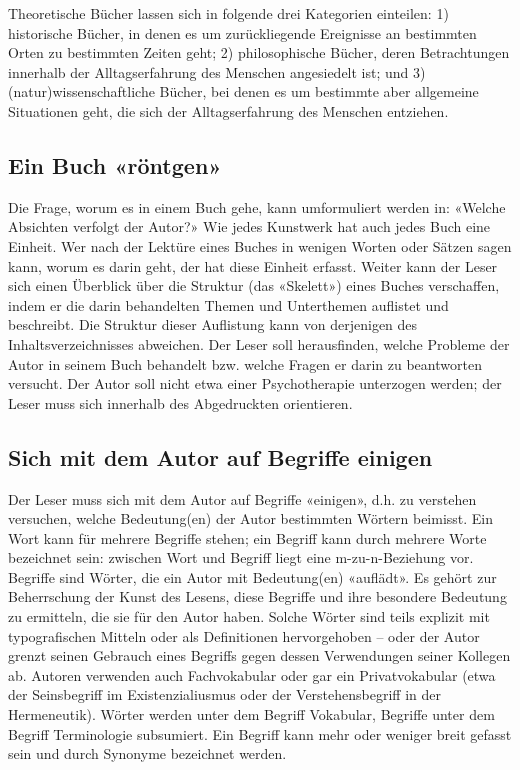 \documentclass[a4paper,11pt]{scrartcl}
\begin{document}
Theoretische Bücher lassen sich in folgende drei Kategorien einteilen: 1) historische Bücher, in denen es um zurückliegende Ereignisse an bestimmten Orten zu bestimmten Zeiten geht; 2) philosophische Bücher, deren Betrachtungen innerhalb der Alltagserfahrung des Menschen angesiedelt ist; und 3) (natur)wissenschaftliche Bücher, bei denen es um bestimmte aber allgemeine Situationen geht, die sich der Alltagserfahrung des Menschen entziehen.

\subsection{Ein Buch «röntgen»}

Die Frage, worum es in einem Buch gehe, kann umformuliert werden in: «Welche Absichten verfolgt der Autor?» Wie jedes Kunstwerk hat auch jedes Buch eine Einheit. Wer nach der Lektüre eines Buches in wenigen Worten oder Sätzen sagen kann, worum es darin geht, der hat diese Einheit erfasst. Weiter kann der Leser sich einen Überblick über die Struktur (das «Skelett») eines Buches verschaffen, indem er die darin behandelten Themen und Unterthemen auflistet und beschreibt. Die Struktur dieser Auflistung kann von derjenigen des Inhaltsverzeichnisses abweichen. Der Leser soll herausfinden, welche Probleme der Autor in seinem Buch behandelt bzw. welche Fragen er darin zu beantworten versucht. Der Autor soll nicht etwa einer Psychotherapie unterzogen werden; der Leser muss sich innerhalb des Abgedruckten orientieren.

\subsection{Sich mit dem Autor auf Begriffe einigen}

Der Leser muss sich mit dem Autor auf Begriffe «einigen», d.h. zu verstehen versuchen, welche Bedeutung(en) der Autor bestimmten Wörtern beimisst. Ein Wort kann für mehrere Begriffe stehen; ein Begriff kann durch mehrere Worte bezeichnet sein: zwischen Wort und Begriff liegt eine m-zu-n-Beziehung vor. Begriffe sind Wörter, die ein Autor mit Bedeutung(en) «auflädt». Es gehört zur Beherrschung der Kunst des Lesens, diese Begriffe und ihre besondere Bedeutung zu ermitteln, die sie für den Autor haben. Solche Wörter sind teils explizit mit typografischen Mitteln oder als Definitionen hervorgehoben – oder der Autor grenzt seinen Gebrauch eines Begriffs gegen dessen Verwendungen seiner Kollegen ab. Autoren verwenden auch Fachvokabular oder gar ein Privatvokabular (etwa der Seinsbegriff im Existenzialiusmus oder der Verstehensbegriff in der Hermeneutik). Wörter werden unter dem Begriff Vokabular, Begriffe unter dem Begriff Terminologie subsumiert. Ein Begriff kann mehr oder weniger breit gefasst sein und durch Synonyme bezeichnet werden.
\end{document}
